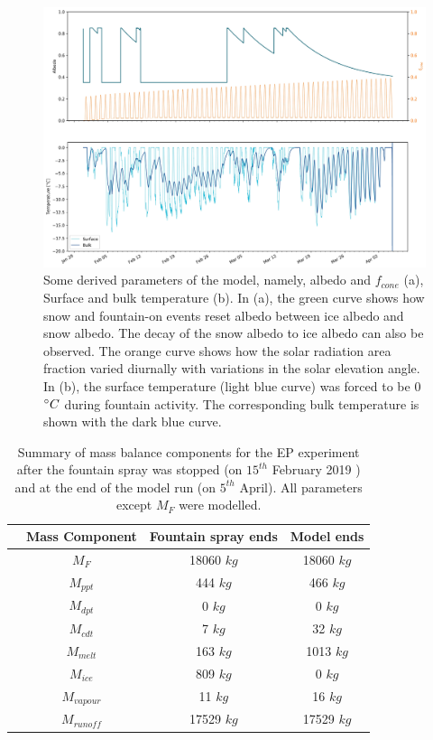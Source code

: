 \documentclass[utf8]{frontiersSCNS} %
\begin{document}
\begin{figure} \begin{center} \includegraphics[width=15 cm]{Figures/Figure_7.jpg} \end{center} \caption{Some derived
  parameters of the model, namely, albedo and $f_{cone}$ (a), Surface and bulk temperature (b). In (a), the green curve
  shows how snow and fountain-on events reset albedo between ice albedo and snow albedo.  The decay of the snow albedo
  to ice albedo can also be observed. The orange curve shows how the solar radiation area fraction varied diurnally
  with variations in the solar elevation angle. In (b), the surface temperature (light blue curve) was forced to be 0
  $\degree C$ during fountain activity. The corresponding bulk temperature is shown with the dark blue curve.}
\label{fig:derived} \end{figure}
  

\begin{table} \caption{Summary of mass balance components for the EP experiment after the fountain
  spray was stopped (on $15^{th}$ February 2019 ) and at the end of the model run (on $5^{th}$ April). All parameters
except $M_{F}$ were modelled.} \centering
    \begin{tabular}{|c|c|c|c|} \hline & \multicolumn{1}{c|}{Mass Component} & \multicolumn{1}{c|}{Fountain spray ends}
    & \multicolumn{1}{c|}{Model ends} \\ \hline & $M_F$ & 18060 $kg$ & 18060 $kg$\\
      \parbox{2mm}{} & $M_{ppt}$ & 444 $kg$ & 466 $kg$\\ & $M_{dpt}$ & 0 $kg$ & 0
      $kg$ \\ & $M_{cdt}$ & 7 $kg$ & 32 $kg$ \\
      \hline & $M_{melt}$ & 163 $kg$ & 1013 $kg$\\
      \parbox{2mm}{} & $M_{ice}$ & 809 $kg$ & 0 $kg$\\ & $M_{vapour}$ & 11 $kg$ & 16
      $kg$\\ & $M_{runoff}$ & 17529 $kg$ & 17529 $kg$\\
 
 \hline \end{tabular} \label{table:MB} \end{table}
\end{document}
